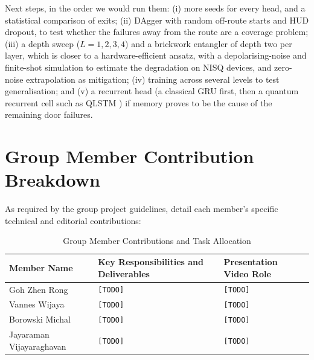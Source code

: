 \documentclass[10pt, a4paper]{article}
\begin{document}
Next steps, in the order we would run them: (i) more seeds for every head, and a statistical comparison of exits; (ii) DAgger with random off-route starts and HUD dropout, to test whether the failures away from the route are a coverage problem; (iii) a depth sweep ($L=1,2,3,4$) and a brickwork entangler of depth two per layer, which is closer to a hardware-efficient ansatz, with a depolarising-noise and finite-shot simulation to estimate the degradation on NISQ devices, and zero-noise extrapolation as mitigation; (iv) training across several levels to test generalisation; and (v) a recurrent head (a classical GRU first, then a quantum recurrent cell such as QLSTM \cite{chen_qlstm_2020}) if memory proves to be the cause of the remaining door failures.

\section{Group Member Contribution Breakdown}
\label{sec:contributions}
As required by the group project guidelines, detail each member's specific technical and editorial contributions:

\begin{table}[htbp]
\centering
\footnotesize
\renewcommand{\arraystretch}{1.1}
\caption{Group Member Contributions and Task Allocation}
\label{tab:contributions}
\begin{tabularx}{\textwidth}{lXp{4.2cm}}
\toprule
\textbf{Member Name} & \textbf{Key Responsibilities and Deliverables} & \textbf{Presentation Video Role} \\
\midrule
Goh Zhen Rong & \texttt{[TODO]} & \texttt{[TODO]} \\
Vannes Wijaya & \texttt{[TODO]} & \texttt{[TODO]} \\
Borowski Michal & \texttt{[TODO]} & \texttt{[TODO]} \\
Jayaraman Vijayaraghavan & \texttt{[TODO]} & \texttt{[TODO]} \\
\bottomrule
\end{tabularx}
\end{table}
\printbibliography
\end{document}
